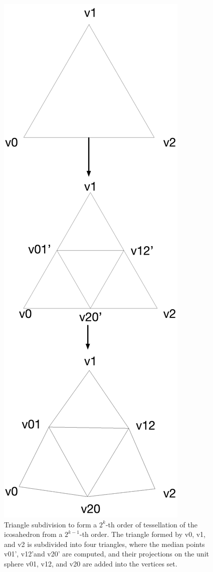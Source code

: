 \documentclass[twoside,twocolumn,10pt]{article}
\begin{document}
\begin{figure}[htb]
    \centering
    \includegraphics[width=.45\linewidth, angle=0]{figs/icosahedron_example/ico_subdivision_V.png}
    \caption{Triangle subdivision to form a $2^k$-th order of tessellation of the icosahedron from a $2^{k-1}$-th order. The triangle formed by v0, v1, and v2 is subdivided into four triangles, where the median points v01', v12'and v20' are computed, and their projections on the unit sphere v01, v12, and v20 are added into the vertices set.
    }
    \label{fig::subdivision_icosahedron}
\end{figure}

\end{document}
